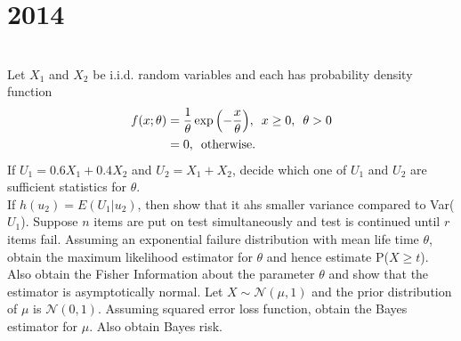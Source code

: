 \section*{2014}
\vspace{-.5cm}
\hrulefill \smallskip\\
 Let $X_1$ and $X_2$ be i.i.d. random variables and each has probability density function \[ \begin{aligned} f(x;\theta) &= \dfrac{1}{\theta}\exp{\left(-\dfrac{x}{\theta}\right)}, \enskip x\geq0, \enskip \theta>0 \\
&= 0, \enskip \text{otherwise.}
\end{aligned} \] If $U_1 = 0.6X_1 + 0.4X_2$ and $U_2 = X_1 + X_2$, decide which one of $U_1$ and $U_2$ are sufficient statistics for $\theta$.\\ If $h(u_2) = E(U_1|u_2)$, then show that it ahs smaller variance compared to Var($U_1$).
\myline
{} Suppose $n$ items are put on test simultaneously and test is continued until $r$ items fail. Assuming an exponential failure distribution with mean life time $\theta$, obtain the maximum likelihood estimator for $\theta$ and hence estimate P($X\geq t$). Also obtain the Fisher Information about the parameter $\theta$ and show that the estimator is asymptotically normal.
\myline
{} Let $X\sim \mathcal{N}(\mu,1)$ and the prior distribution of $\mu$ is $\mathcal{N}(0,1)$. Assuming squared error loss function, obtain the Bayes estimator for $\mu$. Also obtain Bayes risk.